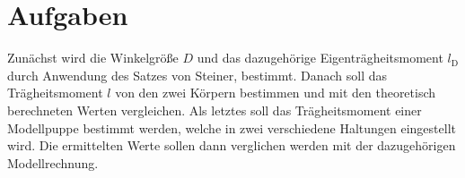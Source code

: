 \section{Aufgaben}

\begin{flushleft}
    Zunächst wird die Winkelgröße $ D $ und das dazugehörige Eigenträgheitsmoment ${l}_{\text{D}}$ durch Anwendung des Satzes von Steiner, bestimmt.
    Danach soll das Trägheitsmoment $ l $ von den zwei Körpern bestimmen und mit den theoretisch berechneten Werten vergleichen. 
    Als letztes soll das Trägheitsmoment einer Modellpuppe bestimmt werden, welche in zwei verschiedene Haltungen eingestellt wird.
    Die ermittelten Werte sollen dann verglichen werden mit der dazugehörigen Modellrechnung. 
\end{flushleft}